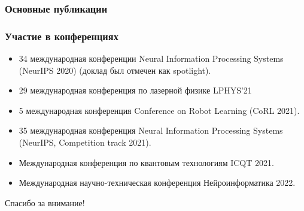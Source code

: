 
\begin{frame}[t,allowframebreaks] %
    \frametitle{Основные публикации}
    \nocite{vakbib1}%
    \nocite{vakbib2}%
    \nocite{wosbib1}%
    \nocite{scbib1}%
    \nocite{confbib1}%
    \nocite{confbib2}%
    \nocite{confbib3}%
    \nocite{confbib4}%
    \nocite{bib1}%
    \nocite{bib2}%
\end{frame}

\begin{frame}
    \frametitle{Участие в конференциях}
    \begin{itemize}
        \item 34 международная конференции Neural Information Processing Systems (NeurIPS 2020) (доклад был отмечен как spotlight).
        \item 29 международная конференция по лазерной физике LPHYS’21
        \item 5 международная конференция Conference on Robot Learning (CoRL 2021).
        \item  35 международная конференция Neural Information Processing Systems (NeurIPS, Competition track 2021).
        \item Международная конференция по квантовым технологиям ICQT 2021.
        \item Международная научно-техническая конференция Нейроинформатика 2022.
    \end{itemize}
\end{frame}

\begin{frame} %
    \begin{center}
        \Huge
        Спасибо за внимание!
    \end{center}
\end{frame}
